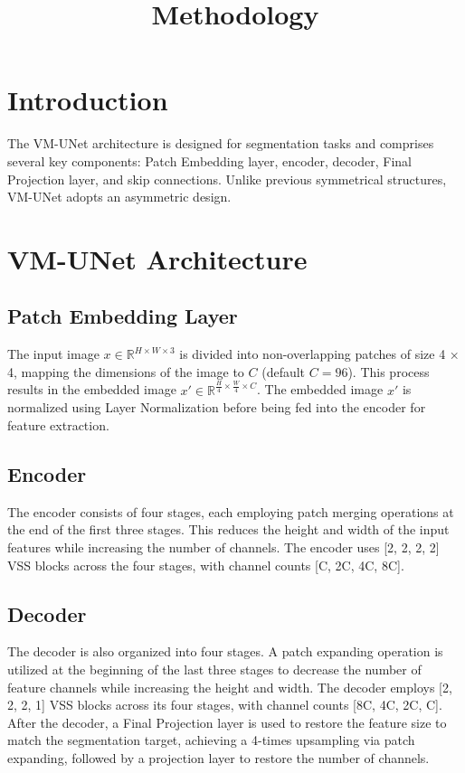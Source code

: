 \documentclass[conference]{IEEEtran}
\title{Methodology}
\begin{document}
\maketitle

\section{Introduction}
The VM-UNet architecture is designed for segmentation tasks and comprises several key components: Patch Embedding layer, encoder, decoder, Final Projection layer, and skip connections. Unlike previous symmetrical structures, VM-UNet adopts an asymmetric design.

\section{VM-UNet Architecture}

\subsection{Patch Embedding Layer}
The input image $ x \in \mathbb{R}^{H \times W \times 3} $ is divided into non-overlapping patches of size 4 × 4, mapping the dimensions of the image to $ C $ (default $ C = 96 $). This process results in the embedded image $ x' \in \mathbb{R}^{\frac{H}{4} \times \frac{W}{4} \times C} $. The embedded image $ x' $ is normalized using Layer Normalization before being fed into the encoder for feature extraction.

\subsection{Encoder}
The encoder consists of four stages, each employing patch merging operations at the end of the first three stages. This reduces the height and width of the input features while increasing the number of channels. The encoder uses [2, 2, 2, 2] VSS blocks across the four stages, with channel counts [C, 2C, 4C, 8C].

\subsection{Decoder}
The decoder is also organized into four stages. A patch expanding operation is utilized at the beginning of the last three stages to decrease the number of feature channels while increasing the height and width. The decoder employs [2, 2, 2, 1] VSS blocks across its four stages, with channel counts [8C, 4C, 2C, C]. After the decoder, a Final Projection layer is used to restore the feature size to match the segmentation target, achieving a 4-times upsampling via patch expanding, followed by a projection layer to restore the number of channels.
\end{document}
